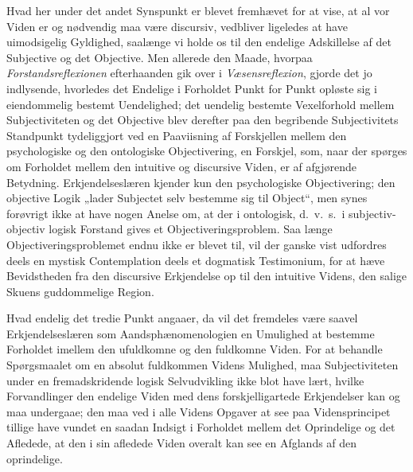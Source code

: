 \documentclass[12pt]{book}
\newcommand{\opage}[1]{\marginnote{\footnotesize\textit{[#1]}}}
\begin{document}
Hvad her under det andet Synspunkt er blevet fremhævet for at vise, at al vor Viden er og nødvendig
maa være discursiv, vedbliver ligeledes at have uimodsigelig Gyldighed, saalænge vi holde os til den
endelige Adskillelse af det Subjective og det Objective. Men allerede den Maade, hvorpaa
\emph{Forstandsreflexionen} efterhaanden gik over i \emph{Væsensreflexion}, gjorde det jo
indlysende, hvorledes det Endelige i Forholdet Punkt for Punkt opløste sig i eiendommelig bestemt
Uendelighed; det uendelig bestemte Vexelforhold mellem Subjectiviteten og det Objective blev
derefter paa den begribende Subjectivitets Standpunkt tydeliggjort ved en Paaviisning af Forskjellen
mellem den psychologiske og den ontologiske Objectivering, en Forskjel, som, naar der spørges om
Forholdet mellem den intuitive og discursive Viden, er af afgjørende Betydning. Erkjendelseslæren
kjender kun den psychologiske Objectivering; den objective Logik „lader Subjectet selv bestemme sig
til Object“, men synes forøvrigt ikke at have nogen Anelse om, at der i ontologisk, d.\ v.\ s.\ i
subjectiv-objectiv logisk Forstand gives et Objectiveringsproblem. Saa%
\opage{251} længe Objectiveringsproblemet endnu ikke er blevet til, vil der ganske vist udfordres deels en
mystisk Contemplation deels et dogmatisk Testimonium, for at hæve Bevidstheden fra den discursive
Erkjendelse op til den intuitive Videns, den salige Skuens guddommelige Region.

Hvad endelig det tredie Punkt angaaer, da vil det fremdeles være saavel Erkjendelseslæren som
Aandsphænomenologien en Umulighed at bestemme Forholdet imellem den ufuldkomne og den fuldkomne
Viden. For at behandle Spørgsmaalet om en absolut fuldkommen Videns Mulighed, maa Subjectiviteten
under en fremadskridende logisk Selvudvikling ikke blot have lært, hvilke Forvandlinger den endelige
Viden med dens forskjelligartede Erkjendelser kan og maa undergaae; den maa ved i alle Videns
Opgaver at see paa Vidensprincipet tillige have vundet en saadan Indsigt i Forholdet mellem det
Oprindelige og det Afledede, at den i sin afledede Viden overalt kan see en Afglands af den
oprindelige.
\end{document}
